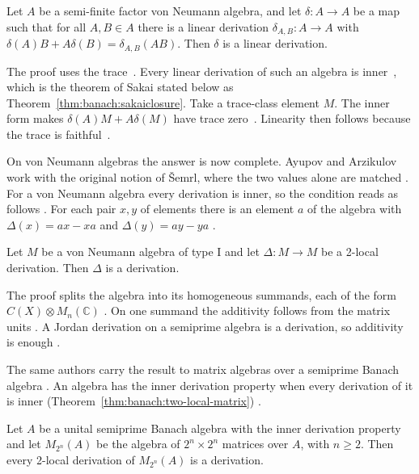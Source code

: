 \begin{theorem}\label{thm:banach:two-local}
Let $A$ be a semi-finite factor von Neumann algebra, and let
$\delta\colon A \to A$ be a map such that for all $A, B \in A$ there is a
linear derivation $\delta_{A,B}\colon A \to A$ with
$\delta(A)B + A\delta(B) = \delta_{A,B}(AB)$. Then $\delta$ is a linear
derivation.
\end{theorem}

The proof uses the trace~\cite[p.~910]{Liu2025TwoLocal}. Every linear
derivation of such an algebra is inner~\cite[p.~910]{Liu2025TwoLocal}, which
is the theorem of Sakai stated below as
Theorem~\ref{thm:banach:sakaiclosure}. Take a trace-class element $M$. The
inner form makes $\delta(A)M + A\delta(M)$ have trace
zero~\cite[p.~910]{Liu2025TwoLocal}. Linearity then follows because the trace
is faithful~\cite[p.~910]{Liu2025TwoLocal}.

On von Neumann algebras the answer is now complete. Ayupov and Arzikulov
work with the original notion of \v{S}emrl, where the two values alone are
matched \cite[p.~1]{AyupovArzikulov2011TwoLocal}. For a von Neumann algebra
every derivation is inner, so the condition reads as follows
\cite[p.~2]{AyupovArzikulov2011TwoLocal}. For each pair $x,y$ of elements
there is an element $a$ of the algebra with $\Delta(x)=ax-xa$ and
$\Delta(y)=ay-ya$ \cite[p.~2]{AyupovArzikulov2011TwoLocal}.

\begin{theorem}\label{thm:banach:two-local-typeI}
Let $M$ be a von Neumann algebra of type I and let $\Delta\colon M\to M$ be
a 2-local derivation. Then $\Delta$ is a derivation.
\end{theorem}

The proof splits the algebra into its homogeneous summands, each of the form
$C(X)\otimes M_n(\mathbb{C})$ \cite[p.~7]{AyupovArzikulov2011TwoLocal}. On
one summand the additivity follows from the matrix units
\cite[Theorem~1, p.~3]{AyupovArzikulov2011TwoLocal}. A Jordan derivation on
a semiprime algebra is a derivation, so additivity is enough
\cite[p.~3]{AyupovArzikulov2011TwoLocal}.

The same authors carry the result to matrix algebras over a semiprime Banach
algebra \cite[p.~1]{AyupovKudaybergenov2014Matrix}. An algebra has the
inner derivation property when every derivation of it is inner (Theorem~\ref{thm:banach:two-local-matrix})
\cite[p.~2]{AyupovKudaybergenov2014Matrix}.\begin{theorem}\label{thm:banach:two-local-matrix}
Let $A$ be a unital semiprime Banach algebra with the inner derivation
property and let $M_{2^n}(A)$ be the algebra of $2^n\times 2^n$ matrices
over $A$, with $n\geq 2$. Then every 2-local derivation of $M_{2^n}(A)$ is
a derivation.
\end{theorem}

